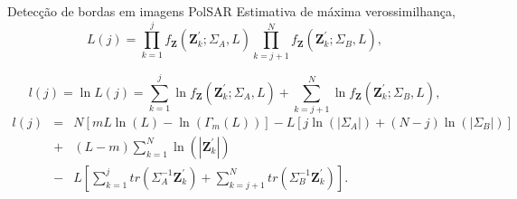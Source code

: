 \documentclass[10pt]{beamer}
\begin{document}
\begin{frame}{Detecção de bordas em imagens PolSAR}
\alert{Estimativa de máxima verossimilhança, \cite{nhfc,gamf,gmbf} }
\begin{equation}
	L(j)=\prod_{k=1}^{j}f_{\mathbf{Z}}(\mathbf{Z}_{k}^{'};\Sigma_{A},L) \prod_{k=j+1}^{N}f_{\mathbf{Z}}(\mathbf{Z}_{k}^{'};\Sigma_{B},L), 
\end{equation}

\begin{equation}
	l(j)=\ln L(j)=\sum_{k=1}^{j}\ln f_{\mathbf{Z}}(\mathbf{Z}_{k}^{'};\Sigma_{A},L)+ \sum_{k=j+1}^{N}\ln f_{\mathbf{Z}}(\mathbf{Z}_{k}^{'};\Sigma_{B},L),
\end{equation}
\begin{equation*}
\begin{array}{rcl}
l(j)&=&N\left[mL\ln{\left(L\right)}-\ln{\left(\Gamma_m(L)\right)}\right]-L\left[j\ln{\left(|\Sigma_{A}|\right)} +(N-j)\ln{\left(|\Sigma_{B}|\right)}\right]\\
	&+&(L-m)\sum_{k=1}^{N}\ln{\left(|\mathbf{Z}_{k}^{'}|\right)}\\
        &-& L\left[\sum_{k=1}^{j}tr(\Sigma_{A}^{-1}\mathbf{Z}_{k}^{'})+ \sum_{k=j+1}^{N}tr(\Sigma_{B}^{-1}\mathbf{Z}_{k}^{'})\right]. 
\end{array}
\end{equation*}

\end{frame}
\end{document}
